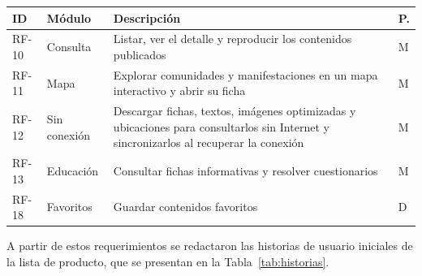 {\centering\singlespacing
  \label{tab:rf_movil}
  \begin{tabular}{|p{}|p{}|p{}|p{}|}
    \hline
    \textbf{ID} & \textbf{Módulo} & \textbf{Descripción} & \textbf{P.} \tabularnewline
    \hline
    \raggedright\hspace{0pt}RF-10 & \raggedright\hspace{0pt}Consulta & \raggedright\hspace{0pt}Listar, ver el detalle y reproducir los contenidos publicados & \raggedright\hspace{0pt}M \tabularnewline
    \hline
    \raggedright\hspace{0pt}RF-11 & \raggedright\hspace{0pt}Mapa & \raggedright\hspace{0pt}Explorar comunidades y manifestaciones en un mapa interactivo y abrir su ficha & \raggedright\hspace{0pt}M \tabularnewline
    \hline
    \raggedright\hspace{0pt}RF-12 & \raggedright\hspace{0pt}Sin conexión & \raggedright\hspace{0pt}Descargar fichas, textos, imágenes optimizadas y ubicaciones para consultarlos sin Internet y sincronizarlos al recuperar la conexión & \raggedright\hspace{0pt}M \tabularnewline
    \hline
    \raggedright\hspace{0pt}RF-13 & \raggedright\hspace{0pt}Educación & \raggedright\hspace{0pt}Consultar fichas informativas y resolver cuestionarios & \raggedright\hspace{0pt}M \tabularnewline
    \hline
    \raggedright\hspace{0pt}RF-18 & \raggedright\hspace{0pt}Favoritos & \raggedright\hspace{0pt}Guardar contenidos favoritos & \raggedright\hspace{0pt}D \tabularnewline
    \hline
  \end{tabular}\par}

A partir de estos requerimientos se redactaron las historias de usuario iniciales de la lista de producto, que se presentan en la Tabla~\ref{tab:historias}.

